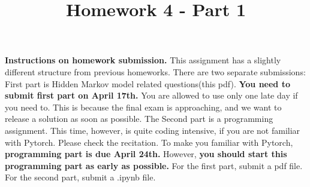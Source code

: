\documentclass[11pt]{article}
\begin{document}

\title{Homework 4 - Part 1}
\date{}
\maketitle


\noindent
\noindent
{\bf Instructions on homework submission.} This assignment has a slightly different structure from previous homeworks. There are two separate submissions: First part is Hidden Markov model related questions(this pdf). \textbf{You need to submit first part on April 17th.} You are allowed to use only one late day if you need to. This is because the final exam is approaching, and we want to release a solution as soon as possible.
The Second part is a programming assignment. This time, however, is quite coding intensive, if you are not familiar with Pytorch. Please check the recitation. To make you familiar with Pytorch, \textbf{programming part is due April 24th.} However, \textbf{you should start this programming part as early as possible.}
For the first part, submit a pdf file. For the second part, submit a .ipynb file.
\end{document}
